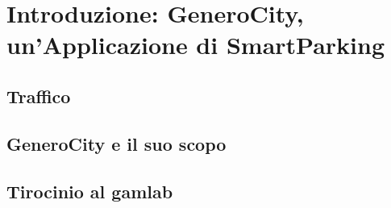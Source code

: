 \chapter{Introduzione: GeneroCity, un'Applicazione di SmartParking}

\section{Traffico}
\section{GeneroCity e il suo scopo}

\section{Tirocinio al gamlab}


